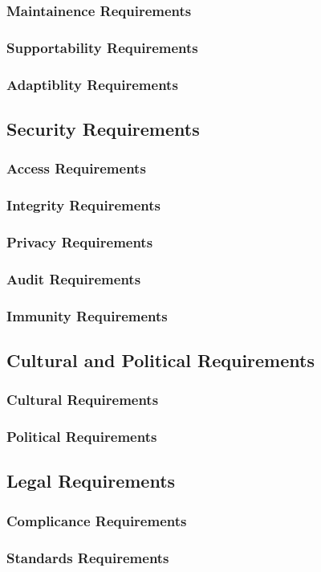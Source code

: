 \documentclass{article}
\begin{document}
\subsubsection{Maintainence Requirements}
\subsubsection{Supportability Requirements}
\subsubsection{Adaptiblity Requirements}

\subsection{Security Requirements}
\subsubsection{Access Requirements}
\subsubsection{Integrity Requirements}
\subsubsection{Privacy Requirements}
\subsubsection{Audit Requirements}
\subsubsection{Immunity Requirements}

\subsection{Cultural and Political Requirements}
\subsubsection{Cultural Requirements}
\subsubsection{Political Requirements}

\subsection{Legal Requirements}
\subsubsection{Complicance Requirements}
\subsubsection{Standards Requirements}
\end{document}

